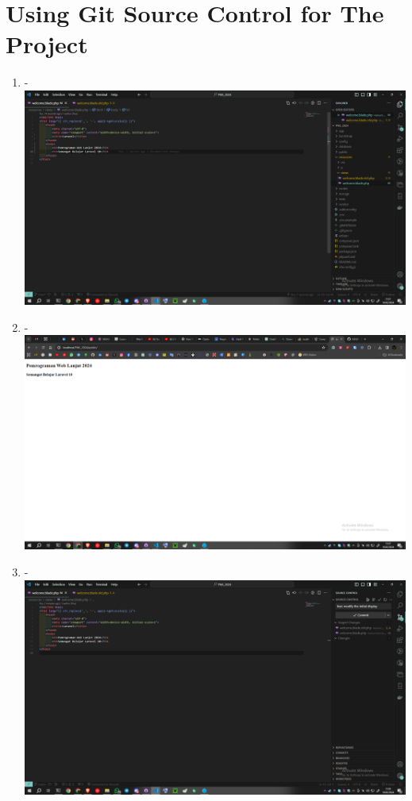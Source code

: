 \documentclass[12pt,titlepage]{article}
\begin{document}
\section{Using Git Source Control for The Project}

\begin{enumerate}[label= \alph*.]
    \item - \\ \includegraphics[width=.9\textwidth]{images/figures/Source Control 1.png}
    \item - \\ \includegraphics[width=.9\textwidth]{images/figures/Source Control 2.png}
    \newpage
    \item - \\ \includegraphics[width=.9\textwidth]{images/figures/Source Control 3.png}

\end{enumerate}
\end{document}
